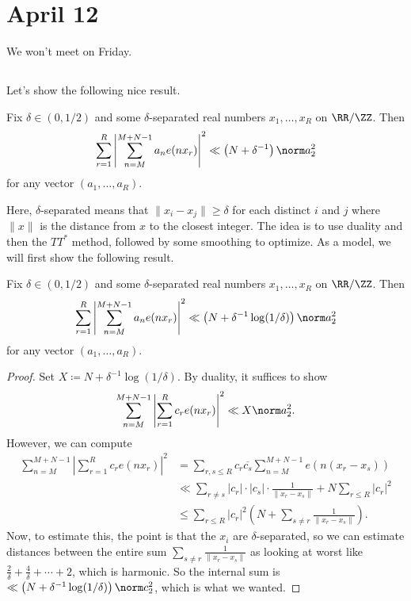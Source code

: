 \documentclass[../notes.tex]{subfiles}
\begin{document}
\section{April 12}

We won't meet on Friday.

\subsection{}
Let's show the following nice result.
\begin{theorem} \label{thm:large-sieve-ineq}
	Fix $\delta\in(0,1/2)$ and some $\delta$-separated real numbers $x_1,\ldots,x_R$ on $\RR/\ZZ$. Then
	\[\sum_{r=1}^R\left|\sum_{n=M}^{M+N-1}a_ne(nx_r)\right|^2\ll\left(N+\delta^{-1}\right)\norm a_2^2\]
	for any vector $(a_1,\ldots,a_R)$.
\end{theorem}
Here, $\delta$-separated means that $\lVert x_i-x_j\rVert\ge\delta$ for each distinct $i$ and $j$ where $\lVert x\rVert$ is the distance from $x$ to the closest integer. The idea is to use duality and then the $TT^*$ method, followed by some smoothing to optimize. As a model, we will first show the following result.
\begin{proposition}
	Fix $\delta\in(0,1/2)$ and some $\delta$-separated real numbers $x_1,\ldots,x_R$ on $\RR/\ZZ$. Then
	\[\sum_{r=1}^R\left|\sum_{n=M}^{M+N-1}a_ne(nx_r)\right|^2\ll\left(N+\delta^{-1}\log(1/\delta)\right)\norm a_2^2\]
	for any vector $(a_1,\ldots,a_R)$.
\end{proposition}
\begin{proof}
	Set $X\coloneqq N+\delta^{-1}\log(1/\delta)$. By duality, it suffices to show
	\[\sum_{n=M}^{M+N-1}\left|\sum_{r=1}^Rc_re(nx_r)\right|^2\ll X\norm a_2^2.\]
	However, we can compute
	\begin{align*}
		\sum_{n=M}^{M+N-1}\left|\sum_{r=1}^Rc_re(nx_r)\right|^2 &= \sum_{r,s\le R}c_r\overline{c_s}\sum_{n=M}^{M+N-1}e(n(x_r-x_s)) \\
		&\ll \sum_{r\ne s}|c_r|\cdot|c_s|\cdot\frac1{\lVert x_r-x_s\rVert}+N\sum_{r\le R}|c_r|^2 \\
		&\le \sum_{r\le R}|c_r|^2\left(N+\sum_{s\ne r}\frac1{\lVert x_r-x_s\rVert}\right).
	\end{align*}
	Now, to estimate this, the point is that the $x_i$ are $\delta$-separated, so we can estimate distances between the entire sum $\sum_{s\ne r}\frac1{\lVert x_r-x_s\rVert}$ as looking at worst like $\frac2\delta+\frac4\delta+\cdots+2$, which is harmonic. So the internal sum is $\ll\left(N+\delta^{-1}\log(1/\delta)\right)\norm c_2^2$, which is what we wanted.
\end{proof}
\end{document}
